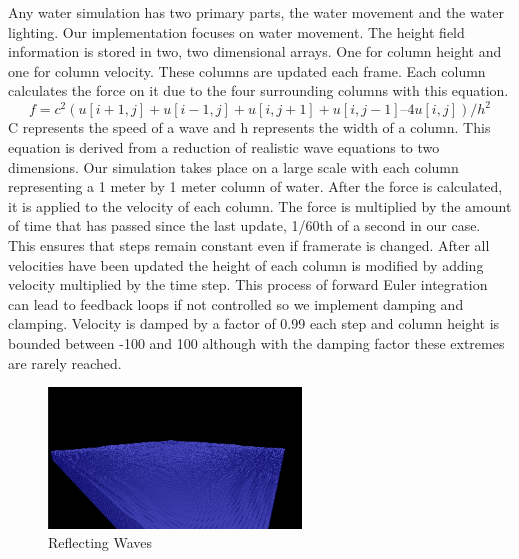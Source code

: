 \documentclass[11pt]{article}
\begin{document}
Any water simulation has two primary parts, the water movement and the water 
lighting.  Our implementation focuses on water movement.  The height field 
information is stored in two, two dimensional arrays.  One for column height 
and one for column velocity.  These columns are updated each frame.  Each 
column calculates the force on it due to the four surrounding columns with this 
equation. \[ f = c^2 ( u[i+1,j] + u[i-1,j] + u[i,j+1] + u[i,j-1] – 4 u[i,j] 
)/h^2 \]  C 
represents the speed of a wave and h represents the width of a column.  This 
equation is derived from a reduction of realistic wave equations to two 
dimensions.  Our simulation takes place on a large scale with each column 
representing a 1 meter by 1 meter column of water.  After the force is 
calculated, it is applied to the velocity of each column.  The force is 
multiplied by the amount of time that has passed since the last update, 1/60th 
of a second in our case.  This ensures that steps remain constant even if 
framerate is changed.  After all velocities have been updated the height of 
each column is modified by adding velocity multiplied by the time step.  This 
process of forward Euler integration can lead to feedback loops if not 
controlled so we implement damping and clamping.  Velocity is damped by a 
factor of 0.99 each step and column height is bounded between -100 and 100 
although with the damping factor these extremes are rarely reached.

\begin{figure}[H]
    \caption{Reflecting Waves}
    \label{fig:reflection}
    \centering
    \includegraphics[width=0.6\textwidth]{../www/images/bouncingWaves}
\end{figure}
	
\end{document}
